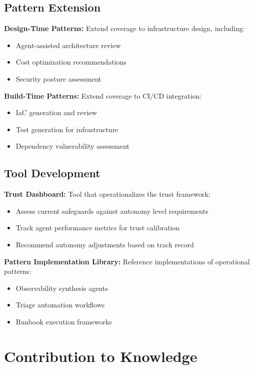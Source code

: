 \subsection{Pattern Extension}
\label{subsec:pattern-extension}

\textbf{Design-Time Patterns:}
Extend coverage to infrastructure design, including:
\begin{itemize}
    \item Agent-assisted architecture review
    \item Cost optimization recommendations
    \item Security posture assessment
\end{itemize}

\textbf{Build-Time Patterns:}
Extend coverage to CI/CD integration:
\begin{itemize}
    \item IaC generation and review
    \item Test generation for infrastructure
    \item Dependency vulnerability assessment
\end{itemize}

\subsection{Tool Development}
\label{subsec:tool-development}

\textbf{Trust Dashboard:}
Tool that operationalizes the trust framework:
\begin{itemize}
    \item Assess current safeguards against autonomy level requirements
    \item Track agent performance metrics for trust calibration
    \item Recommend autonomy adjustments based on track record
\end{itemize}

\textbf{Pattern Implementation Library:}
Reference implementations of operational patterns:
\begin{itemize}
    \item Observability synthesis agents
    \item Triage automation workflows
    \item Runbook execution frameworks
\end{itemize}

\section{Contribution to Knowledge}
\label{sec:contribution}

